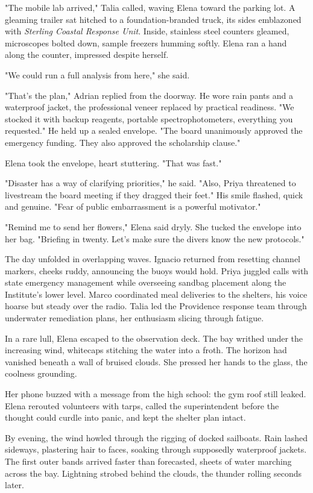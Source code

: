 "The mobile lab arrived," Talia called, waving Elena toward the parking lot. A gleaming trailer sat hitched to a foundation-branded truck, its sides emblazoned with \textit{Sterling Coastal Response Unit}. Inside, stainless steel counters gleamed, microscopes bolted down, sample freezers humming softly. Elena ran a hand along the counter, impressed despite herself.

"We could run a full analysis from here," she said.

"That's the plan," Adrian replied from the doorway. He wore rain pants and a waterproof jacket, the professional veneer replaced by practical readiness. "We stocked it with backup reagents, portable spectrophotometers, everything you requested." He held up a sealed envelope. "The board unanimously approved the emergency funding. They also approved the scholarship clause."

Elena took the envelope, heart stuttering. "That was fast."

"Disaster has a way of clarifying priorities," he said. "Also, Priya threatened to livestream the board meeting if they dragged their feet." His smile flashed, quick and genuine. "Fear of public embarrassment is a powerful motivator."

"Remind me to send her flowers," Elena said dryly. She tucked the envelope into her bag. "Briefing in twenty. Let's make sure the divers know the new protocols."

The day unfolded in overlapping waves. Ignacio returned from resetting channel markers, cheeks ruddy, announcing the buoys would hold. Priya juggled calls with state emergency management while overseeing sandbag placement along the Institute's lower level. Marco coordinated meal deliveries to the shelters, his voice hoarse but steady over the radio. Talia led the Providence response team through underwater remediation plans, her enthusiasm slicing through fatigue.

In a rare lull, Elena escaped to the observation deck. The bay writhed under the increasing wind, whitecaps stitching the water into a froth. The horizon had vanished beneath a wall of bruised clouds. She pressed her hands to the glass, the coolness grounding.

Her phone buzzed with a message from the high school: the gym roof still leaked. Elena rerouted volunteers with tarps, called the superintendent before the thought could curdle into panic, and kept the shelter plan intact.

By evening, the wind howled through the rigging of docked sailboats. Rain lashed sideways, plastering hair to faces, soaking through supposedly waterproof jackets. The first outer bands arrived faster than forecasted, sheets of water marching across the bay. Lightning strobed behind the clouds, the thunder rolling seconds later.

